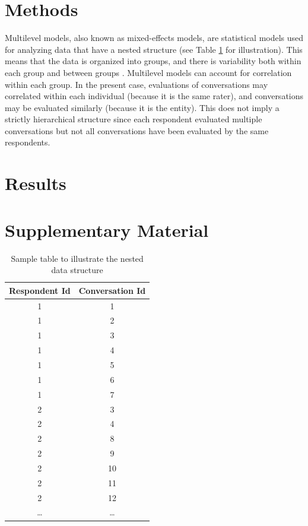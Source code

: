 \documentclass{article}
\begin{document}
\clearpage

\section{Methods}

Multilevel models, also known as mixed-effects models, are statistical models used for analyzing data that have a nested structure (see Table \ref{sample-table}  for illustration). This means that the data is organized into groups, and there is variability both within each group and between groups \citep{hox2017multilevel}. Multilevel models can account for correlation within each group. In the present case, evaluations of conversations may correlated within each individual (because it is the same rater), and conversations may be evaluated similarly (because it is the entity). This does not imply a strictly hierarchical structure since each respondent evaluated multiple conversations but not all conversations have been evaluated by the same respondents. 


\section{Results}












\newpage



\clearpage
\section{Supplementary Material}

\begin{table}[htbp]
    \centering
    \begin{tabular}{|c|c|}
    \hline
    \textbf{Respondent Id} & \textbf{Conversation Id} \\
    \hline
    1 & 1 \\
    1 & 2 \\
    1 & 3 \\
    1 & 4 \\
    1 & 5 \\
    1 & 6 \\
    1 & 7 \\
    \midrule
    2 & 3 \\
    2 & 4 \\
    2 & 8 \\
    2 & 9 \\
    2 & 10 \\
    2 & 11 \\
    2 & 12 \\
    \dots & \dots \\
    \hline
    \end{tabular}
    \caption{Sample table to illustrate the nested data structure}
    \label{sample-table}
\end{table}
\end{document}
